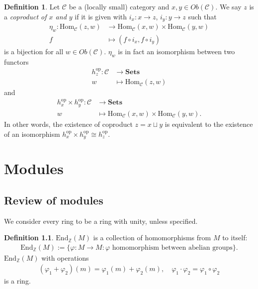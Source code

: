 \documentclass[12pt]{report}
\theoremstyle{plain}
\theoremstyle{remark}
\theoremstyle{definition}
\newtheorem{definition}[theorem]{Definition}
\newcommand{\Z}{\mathbb{Z}}
\newcommand{\Hom}[3]{\mathrm{Hom}_{#3}(#1,#2)}
\begin{document}
\begin{definition}
    Let $\mathcal{C}$ be a (locally small) category and $x,y\in Ob(\mathcal{C})$. We say $z$ is a \emph{coproduct of $x$ and $y$} if it is given with $i_x:x\rightarrow z$, $i_y:y\rightarrow z$ such that
    \begin{align*}
        \eta_w : \mathrm{Hom}_\mathcal{C}(z,w) &\rightarrow\mathrm{Hom}_\mathcal{C}(x,w)\times\mathrm{Hom}_\mathcal{C}(y,w) \\
        f &\mapsto (f\circ i_x, f\circ i_y) 
    \end{align*}
    is a bijection for all $w\in Ob(\mathcal{C})$. $\eta_w$ is in fact an isomorphism between two functors
    \begin{align*}
        h_z^\mathrm{op}:\mathcal{C} &\rightarrow \mathbf{Sets} \\
        w &\mapsto \Hom{z}{w}{\mathcal{C}}
    \end{align*}
    and
    \begin{align*}
        h_x^\mathrm{op}\times h_y^\mathrm{op} : \mathcal{C} &\rightarrow \mathbf{Sets} \\
        w &\mapsto \Hom{x}{w}{\mathcal{C}} \times \Hom{y}{w}{\mathcal{C}}.
    \end{align*}
    In other words, the existence of coproduct $z=x\sqcup y$ is equivalent to the existence of an isomorphism $h_x^\mathrm{op}\times h_y^\mathrm{op} \cong h_z^\mathrm{op}$.
\end{definition}






\chapter{Modules}

\section{Review of modules}

We consider every ring to be a ring with unity, unless specified.

\begin{definition}
    $\mathrm{End}_\Z(M)$ is a collection of homomorphisms from $M$ to itself:
    \begin{align*}
        \mathrm{End}_\Z(M) := \{\varphi:M\rightarrow M : \varphi\text{ homomorphism between abelian groups}\}.
    \end{align*}
    $\mathrm{End}_\Z(M)$ with operations
    \begin{align*}
        (\varphi_1 + \varphi_2)(m) = \varphi_1(m) + \varphi_2(m),\quad \varphi_1\cdot\varphi_2 = \varphi_1\circ \varphi_2
    \end{align*}
    is a ring.
\end{definition}
\end{document}
